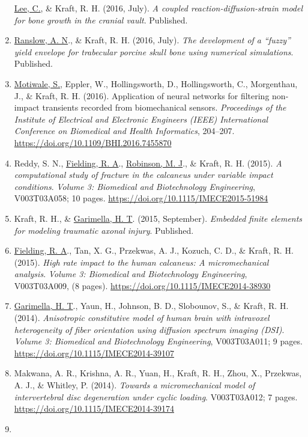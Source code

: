 \documentclass[11pt]{article}
\begin{document}
\begin{enumerate}
  \underline{Lee, C.}, \& Kraft, R. 
H. 
(2016, July). 
\emph{A coupled
  reaction-diffusion-strain model for bone growth in the cranial vault}.
  Published.
\item
  \underline{Ranslow, A. 
N}., \& Kraft, R. 
H. 
(2016, July). 
\emph{The development of
  a ``fuzzy'' yield envelope for trabecular porcine skull bone using
  numerical simulations}. 
Published.
\item
  \underline{Motiwale, S.}, Eppler, W., Hollingsworth, D., Hollingsworth, C.,
  Morgenthau, J., \& Kraft, R. 
H. 
(2016). 
Application of neural networks
  for filtering non-impact transients recorded from biomechanical
  sensors. 
\emph{Proceedings of the Institute of Electrical and
  Electronic Engineers (IEEE) International Conference on Biomedical and
  Health Informatics}, 204--207.
  \url{https://doi.org/10.1109/BHI.2016.7455870}
\item
  Reddy, S. 
N., \underline{Fielding, R. 
A}., \underline{Robinson, M. 
J}., \& Kraft, R. 
H.
  (2015). 
\emph{A computational study of fracture in the calcaneus under
  variable impact conditions}. 
\emph{Volume 3: Biomedical and
  Biotechnology Engineering}, V003T03A058; 10 pages.
  \url{https://doi.org/10.1115/IMECE2015-51984}
\item
  Kraft, R. 
H., \& \underline{Garimella, H. 
T}. 
(2015, September). 
\emph{Embedded
  finite elements for modeling traumatic axonal injury}. 
Published.
\item
  \underline{Fielding, R. 
A}., Tan, X. 
G., Przekwas, A. 
J., Kozuch, C. 
D., \& Kraft,
  R. 
H. 
(2015). 
\emph{High rate impact to the human calcaneus: A
  micromechanical analysis}. 
\emph{Volume 3: Biomedical and
  Biotechnology Engineering}, V003T03A009, (8 pages).
  \url{https://doi.org/10.1115/IMECE2014-38930}
\item
  \underline{Garimella, H. 
T}., Yaun, H., Johnson, B. 
D., Slobounov, S., \& Kraft,
  R. 
H. 
(2014). 
\emph{Anisotropic constitutive model of human brain with
  intravoxel heterogeneity of fiber orientation using diffusion spectrum
  imaging (DSI)}. 
\emph{Volume 3: Biomedical and Biotechnology
  Engineering}, V003T03A011; 9 pages.
  \url{https://doi.org/10.1115/IMECE2014-39107}
\item
  Makwana, A. 
R., Krishna, A. 
R., Yuan, H., Kraft, R. 
H., Zhou, X.,
  Przekwas, A. 
J., \& Whitley, P. 
(2014). 
\emph{Towards a
  micromechanical model of intervertebral disc degeneration under cyclic
  loading}. 
V003T03A012; 7 pages.
  \url{https://doi.org/10.1115/IMECE2014-39174}
\item

\end{enumerate}
\end{document}
